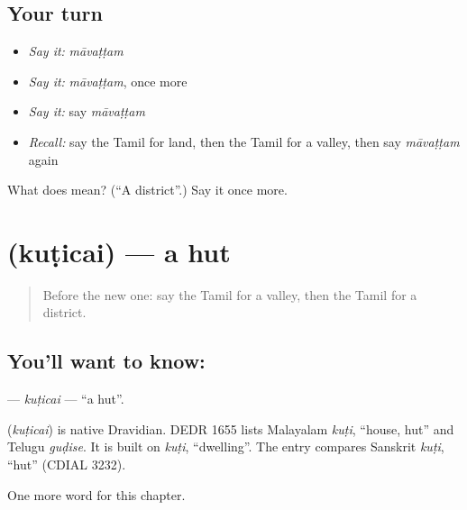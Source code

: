 \subsection*{Your turn}
\begin{itemize}
\raggedright
  \item \emph{Say it:} \emph{māvaṭṭam}
  \item \emph{Say it:} \emph{māvaṭṭam}, once more
  \item \emph{Say it:} say \emph{māvaṭṭam}
  \item \emph{Recall:} say the Tamil for land, then the Tamil for a valley, then say \emph{māvaṭṭam} again
\end{itemize}

\begin{tcolorbox}[breakable,colback=teal!4,colframe=teal!35!black,title={Before you move on}]
What does  mean? (\textquotedblleft{}A district\textquotedblright{}.) Say it once more.
\end{tcolorbox}
\section[\texorpdfstring{\ta{குடிசை} (kuṭicai)}{குடிசை (kuṭicai)}]{ (kuṭicai) — a hut}

\label{lesson:TA-C265-kuticai}



\begin{quote}
Before the new one: say the Tamil for a valley, then the Tamil for a district.
\end{quote}

\subsection*{You'll want to know: }
\textbf{} — \emph{kuṭicai} — \textquotedblleft{}a hut\textquotedblright{}.

\begin{cousinweb}
\textbf{} (\emph{kuṭicai}) is native Dravidian. DEDR 1655 lists Malayalam \emph{kuṭi}, \textquotedblleft{}house, hut\textquotedblright{} and Telugu \emph{guḍise}. It is built on \emph{kuṭi}, \textquotedblleft{}dwelling\textquotedblright{}. The entry compares Sanskrit \emph{kuṭi}, \textquotedblleft{}hut\textquotedblright{} (CDIAL 3232).
\end{cousinweb}

\begin{grammarlens}[title={What you've built}]
One more word for this chapter.
\end{grammarlens}


